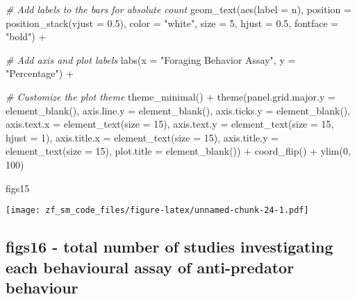 \documentclass[
]{article}
\newenvironment{Shaded}{\begin{snugshade}}{\end{snugshade}}
\newcommand{\AttributeTok}[1]{\textcolor[rgb]{0.77,0.63,0.00}{#1}}
\newcommand{\CommentTok}[1]{\textcolor[rgb]{0.56,0.35,0.01}{\textit{#1}}}
\newcommand{\DecValTok}[1]{\textcolor[rgb]{0.00,0.00,0.81}{#1}}
\newcommand{\FloatTok}[1]{\textcolor[rgb]{0.00,0.00,0.81}{#1}}
\newcommand{\FunctionTok}[1]{\textcolor[rgb]{0.00,0.00,0.00}{#1}}
\newcommand{\NormalTok}[1]{#1}
\newcommand{\SpecialCharTok}[1]{\textcolor[rgb]{0.00,0.00,0.00}{#1}}
\newcommand{\StringTok}[1]{\textcolor[rgb]{0.31,0.60,0.02}{#1}}
\begin{document}
\begin{Shaded}
\begin{Highlighting}[]
  \CommentTok{\# Add labels to the bars for absolute count  }
  \FunctionTok{geom\_text}\NormalTok{(}\FunctionTok{aes}\NormalTok{(}\AttributeTok{label =}\NormalTok{ n), }\AttributeTok{position =} \FunctionTok{position\_stack}\NormalTok{(}\AttributeTok{vjust =} \FloatTok{0.5}\NormalTok{), }\AttributeTok{color =} \StringTok{"white"}\NormalTok{, }\AttributeTok{size =} \DecValTok{5}\NormalTok{, }\AttributeTok{hjust =} \FloatTok{0.5}\NormalTok{, }\AttributeTok{fontface =}   \StringTok{"bold"}\NormalTok{) }\SpecialCharTok{+}
  
  \CommentTok{\# Add axis and plot labels}
  \FunctionTok{labs}\NormalTok{(}\AttributeTok{x =} \StringTok{"Foraging Behavior Assay"}\NormalTok{, }\AttributeTok{y =} \StringTok{"Percentage"}\NormalTok{) }\SpecialCharTok{+}
  
  \CommentTok{\# Customize the plot theme}
  \FunctionTok{theme\_minimal}\NormalTok{() }\SpecialCharTok{+}
  \FunctionTok{theme}\NormalTok{(}\AttributeTok{panel.grid.major.y =} \FunctionTok{element\_blank}\NormalTok{(),}
    \AttributeTok{axis.line.y =} \FunctionTok{element\_blank}\NormalTok{(),}
    \AttributeTok{axis.ticks.y =} \FunctionTok{element\_blank}\NormalTok{(),}
    \AttributeTok{axis.text.x =} \FunctionTok{element\_text}\NormalTok{(}\AttributeTok{size =} \DecValTok{15}\NormalTok{),}
    \AttributeTok{axis.text.y =} \FunctionTok{element\_text}\NormalTok{(}\AttributeTok{size =} \DecValTok{15}\NormalTok{, }\AttributeTok{hjust =} \DecValTok{1}\NormalTok{),}
    \AttributeTok{axis.title.x =} \FunctionTok{element\_text}\NormalTok{(}\AttributeTok{size =} \DecValTok{15}\NormalTok{),}
    \AttributeTok{axis.title.y =} \FunctionTok{element\_text}\NormalTok{(}\AttributeTok{size =} \DecValTok{15}\NormalTok{),}
    \AttributeTok{plot.title =} \FunctionTok{element\_blank}\NormalTok{()) }\SpecialCharTok{+}
    \FunctionTok{coord\_flip}\NormalTok{() }\SpecialCharTok{+}
    \FunctionTok{ylim}\NormalTok{(}\DecValTok{0}\NormalTok{, }\DecValTok{100}\NormalTok{)}

\NormalTok{figs15}
\end{Highlighting}
\end{Shaded}

\texttt{[image: zf\_sm\_code\_files/figure-latex/unnamed-chunk-24-1.pdf]}

\hypertarget{figs16---total-number-of-studies-investigating-each-behavioural-assay-of-anti-predator-behaviour}{%
\subsection{figs16 - total number of studies investigating each
behavioural assay of anti-predator
behaviour}\label{figs16---total-number-of-studies-investigating-each-behavioural-assay-of-anti-predator-behaviour}}
\end{document}
